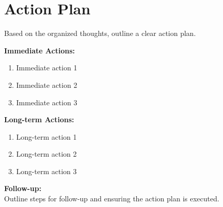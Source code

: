 \documentclass[a4paper, 12pt]{article}
\begin{document}
\section*{Action Plan}
\noindent
Based on the organized thoughts, outline a clear action plan.

\vspace{0.5cm}

\noindent
\textbf{Immediate Actions:}
\begin{enumerate}
    \item Immediate action 1
    \item Immediate action 2
    \item Immediate action 3
\end{enumerate}

\vspace{0.5cm}

\noindent
\textbf{Long-term Actions:}
\begin{enumerate}
    \item Long-term action 1
    \item Long-term action 2
    \item Long-term action 3
\end{enumerate}

\vspace{0.5cm}

\noindent
\textbf{Follow-up:} \\
Outline steps for follow-up and ensuring the action plan is executed.
\end{document}
